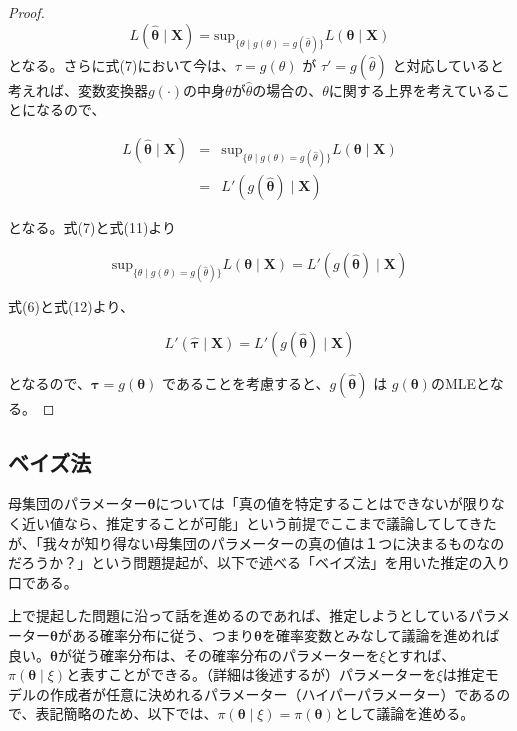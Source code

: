 \documentclass[a4paper,dvipdfmx]{jsarticle}
\begin{document}
\begin{proof}
\begin{equation}
L(\bm{\hat{\theta}} \mid \bm{X}) = \mathrm{sup}_{\{ \theta \mid g(\theta)=g(\hat{\theta}) \}} L(\bm{\theta} \mid \bm{X})
\end{equation}
となる。さらに式(7)において今は、$\tau = g(\theta)$ が $\tau' = g(\hat{\theta})$ と対応していると考えれば、変数変換器$g(\cdot)$の中身$\theta$が$\hat{\theta}$の場合の、$\theta$に関する上界を考えていることになるので、

\begin{eqnarray}
L(\bm{\hat{\theta}} \mid \bm{X}) &=& \mathrm{sup}_{\{ \theta \mid g(\theta)=g(\hat{\theta}) \}} L(\bm{\theta} \mid \bm{X}) \nonumber \\
                                 &=& L'(g(\bm{\hat{\theta}}) \mid \bm{X})
\end{eqnarray}

となる。式(7)と式(11)より

\begin{equation}
\mathrm{sup}_{\{ \theta \mid g(\theta)=g(\hat{\theta}) \}} L(\bm{\theta} \mid \bm{X}) = L'(g(\bm{\hat{\theta}}) \mid \bm{X})
\end{equation}

式(6)と式(12)より、

\begin{equation}
 L'(\bm{\hat{\tau}} \mid \bm{X}) = L'(g(\bm{\hat{\theta}}) \mid \bm{X})
\end{equation}

となるので、$\bm{\tau} = g(\bm{\theta})$ であることを考慮すると、$g(\bm{\hat{\theta}})$ は $g(\bm{\theta})$のMLEとなる。
\end{proof}


\subsection{ベイズ法}
母集団のパラメーター$\bm{\theta}$については「真の値を特定することはできないが限りなく近い値なら、推定することが可能」という前提でここまで議論してしてきたが、「我々が知り得ない母集団のパラメーターの真の値は１つに決まるものなのだろうか？」という問題提起が、以下で述べる「ベイズ法」を用いた推定の入り口である。

上で提起した問題に沿って話を進めるのであれば、推定しようとしているパラメーター$\bm{\theta}$がある確率分布に従う、つまり$\bm{\theta}$を確率変数とみなして議論を進めれば良い。$\bm{\theta}$が従う確率分布は、その確率分布のパラメーターを$\xi$とすれば、$\pi(\bm{\theta} \mid \xi)$と表すことができる。（詳細は後述するが）パラメーターを$\xi$は推定モデルの作成者が任意に決めれるパラメーター（ハイパーパラメーター）であるので、表記簡略のため、以下では、$\pi(\bm{\theta} \mid \xi) = \pi(\bm{\theta})$として議論を進める。
\end{document}
